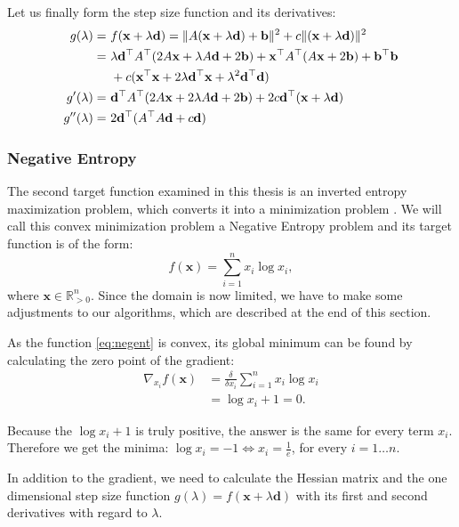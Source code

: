 \documentclass[a4paper,english,titlepage,12pt]{article}
\newcommand{\vect}[1]{\ensuremath{\mathbf{#1}}}
\newcommand{\trans}[1]{\ensuremath\vect{#1}^\top}
\newcommand{\norm}[1]{\ensuremath\Vert #1 \Vert}
\begin{document}
Let us finally form the step size function and its derivatives:
\begin{align}
    g(\lambda) =\ &f(\vect{x} + \lambda \vect{d}) = \norm{A (\vect{x} + \lambda \vect{d}) + \vect{b}} ^ 2 + c \norm{(\vect{x} + \lambda \vect{d})} ^ 2 \nonumber \\
    =\ &\lambda \trans{d} A^\top ( 2 A \vect{x} + \lambda A \vect{d} + 2 \vect{b}) + \trans{x} A^\top ( A \vect{x} + 2 \vect{b} ) + \trans{b} \vect{b} \\
    &+ c ( \trans{x} \vect{x} + 2 \lambda \trans{d} \vect{x} + \lambda ^ 2 \trans{d} \vect{d}) \nonumber \\
    g'(\lambda) =\ &\trans{d} A^\top ( 2 A \vect{x} + 2 \lambda A \vect{d} + 2 \vect{b} ) + 2 c \trans{d} ( \vect{x} + \lambda \vect{d} ) \\
    g''(\lambda) =\ &2 \trans{d} ( A^\top A \vect{d} + c \vect{d})
\end{align}


\subsubsection{Negative Entropy}


The second target function examined in this thesis is an inverted entropy maximization problem, which converts it into a minimization problem \cite{book:convex_optimization}. We will call this convex minimization problem a Negative Entropy problem and its target function is of the form:
\begin{equation}\label{eq:negent}
	f(\vect{x}) = \sum_{i=1}^{n} x_i \log x_i,
\end{equation}
where $\vect{x} \in \mathbb{R}_{> 0}^n$. Since the domain is now limited, we have to make some adjustments to our algorithms, which are described at the end of this section.

As the function \eqref{eq:negent} is convex, its global minimum can be found by calculating the zero point of the gradient:
\begin{align}
    \nabla_{x_i} f(\vect{x}) &= \frac{\delta}{\delta x_i} \sum_{i=1}^{n} x_i \log x_i \\
                      &= \log x_i + 1 = 0.
\end{align}

Because the $\log x_i + 1$ is truly positive, the answer is the same for every term $x_i$. Therefore we get the minima: $\log x_i = -1 \Leftrightarrow x_i = \frac{1}{e}$, for every $i = 1 \dots n$.

In addition to the gradient, we need to calculate the Hessian matrix and the one dimensional step size function $g(\lambda) = f(\vect{x} + \lambda \vect{d})$ with its first and second derivatives with regard to $\lambda$.
\end{document}
